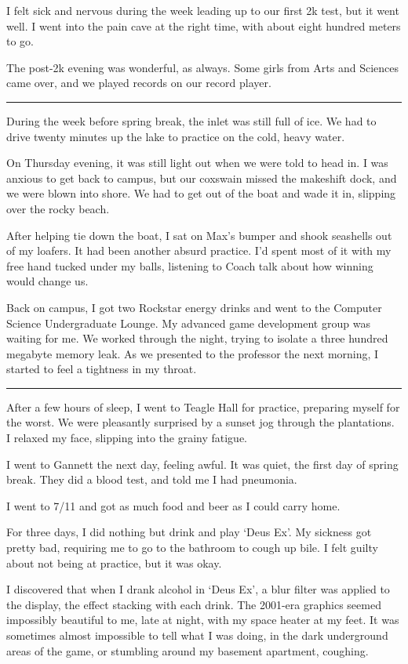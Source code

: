 I felt sick and nervous during the week leading up to our first 2k test, but it
went well.  I went into the pain cave at the right time, with about eight
hundred meters to go.

The post-2k evening was wonderful, as always.  Some girls from Arts and Sciences
came over, and we played records on our record player.

\plainfancybreak{12pt}{2}{}

During the week before spring break, the inlet was still full of ice.  We had to
drive twenty minutes up the lake to practice on the cold, heavy water.

On Thursday evening, it was still light out when we were told to head in.  I was
anxious to get back to campus, but our coxswain missed the makeshift dock, and
we were blown into shore.  We had to get out of the boat and wade it in,
slipping over the rocky beach.

After helping tie down the boat, I sat on Max's bumper and shook seashells out
of my loafers.  It had been another absurd practice.  I'd spent most of it with
my free hand tucked under my balls, listening to Coach talk about how winning
would change us.

Back on campus, I got two Rockstar energy drinks and went to the Computer
Science Undergraduate Lounge.  My advanced game development group was waiting
for me.  We worked through the night, trying to isolate a three hundred megabyte
memory leak.  As we presented to the professor the next morning, I started to
feel a tightness in my throat.

\plainfancybreak{12pt}{2}{}

After a few hours of sleep, I went to Teagle Hall for practice, preparing myself
for the worst.  We were pleasantly surprised by a sunset jog through the
plantations.  I relaxed my face, slipping into the grainy fatigue.

I went to Gannett the next day, feeling awful.  It was quiet, the first day of
spring break.  They did a blood test, and told me I had pneumonia.

I went to 7/11 and got as much food and beer as I could carry home.

For three days, I did nothing but drink and play `Deus Ex'.  My sickness got
pretty bad, requiring me to go to the bathroom to cough up bile.  I felt guilty
about not being at practice, but it was okay.

I discovered that when I drank alcohol in `Deus Ex', a blur filter was applied
to the display, the effect stacking with each drink.  The 2001-era graphics
seemed impossibly beautiful to me, late at night, with my space heater at my
feet.  It was sometimes almost impossible to tell what I was doing, in the dark
underground areas of the game, or stumbling around my basement apartment,
coughing.

